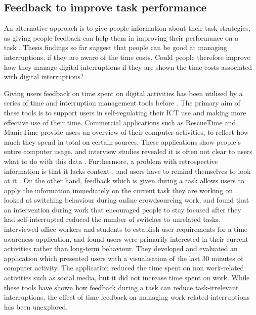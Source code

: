 \subsection{Feedback to improve task performance}
An alternative approach is to give people information about their task strategies, as giving people feedback can help them in improving their performance on a task \citep{Maior2018, Farmer2017}. Thesis findings so far suggest that people can be good at managing interruptions, if they are aware of the time costs. Could people therefore improve how they manage digital interruptions if they are shown the time costs associated with digital interruptions? 

Giving users feedback on time spent on digital activities has been utilised by a series of time and interruption management tools before \citep{Lyngs2018}. The primary aim of these tools is to support users in self-regulating their ICT use and making more effective use of their time. Commercial applications such as RescueTime and ManicTime provide users an overview of their computer activities, to reflect how much they spend in total on certain sources. These applications show people’s entire computer usage, and interview studies revealed it is often not clear to users what to do with this data \citep{Collins2014}. Furthermore, a problem with retrospective information is that it lacks context \citep{Collins2014}, and users have to remind themselves to look at it \citep{Whittaker2016}. On the other hand, feedback which is given during a task allows users to apply the information immediately on the current task they are working on \citep{Gould2016a, Maior2018}. \citet{Gould2016a} looked at switching behaviour during online crowdsourcing work, and found that an intervention during work that encouraged people to stay focused after they had self-interrupted reduced the number of switches to unrelated tasks. \citet{Whittaker2016} interviewed office workers and students to establish user requirements for a time awareness application, and found users were primarily interested in their current activities rather than long-term behaviour. They developed and evaluated an application which presented users with a visualisation of the last 30 minutes of computer activity. The application reduced the time spent on non work-related activities such as social media, but it did not increase time spent on work. While these tools have shown how feedback during a task can reduce task-irrelevant interruptions, the effect of time feedback on managing work-related interruptions has been unexplored.

